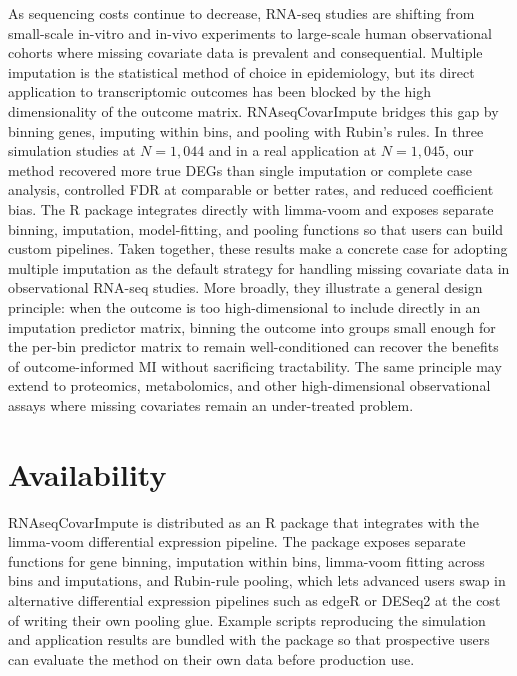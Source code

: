 \documentclass[11pt]{article}
\begin{document}
As sequencing costs continue to decrease, RNA-seq studies are shifting from small-scale in-vitro and in-vivo experiments to large-scale human observational cohorts where missing covariate data is prevalent and consequential. Multiple imputation is the statistical method of choice in epidemiology, but its direct application to transcriptomic outcomes has been blocked by the high dimensionality of the outcome matrix. RNAseqCovarImpute bridges this gap by binning genes, imputing within bins, and pooling with Rubin's rules. In three simulation studies at $N=1{,}044$ and in a real application at $N=1{,}045$, our method recovered more true DEGs than single imputation or complete case analysis, controlled FDR at comparable or better rates, and reduced coefficient bias. The R package integrates directly with limma-voom and exposes separate binning, imputation, model-fitting, and pooling functions so that users can build custom pipelines. Taken together, these results make a concrete case for adopting multiple imputation as the default strategy for handling missing covariate data in observational RNA-seq studies. More broadly, they illustrate a general design principle: when the outcome is too high-dimensional to include directly in an imputation predictor matrix, binning the outcome into groups small enough for the per-bin predictor matrix to remain well-conditioned can recover the benefits of outcome-informed MI without sacrificing tractability. The same principle may extend to proteomics, metabolomics, and other high-dimensional observational assays where missing covariates remain an under-treated problem.

\section*{Availability}

RNAseqCovarImpute is distributed as an R package that integrates with the limma-voom differential expression pipeline. The package exposes separate functions for gene binning, imputation within bins, limma-voom fitting across bins and imputations, and Rubin-rule pooling, which lets advanced users swap in alternative differential expression pipelines such as edgeR or DESeq2 at the cost of writing their own pooling glue. Example scripts reproducing the simulation and application results are bundled with the package so that prospective users can evaluate the method on their own data before production use.



\end{document}
